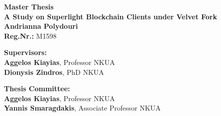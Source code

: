 \begin{center}
    \vspace{3cm}
    \large \textbf{Master Thesis}\\
    \vspace{3cm}
    \textbf{A Study on Superlight Blockchain Clients under Velvet Fork}\\
    \vspace{3cm}
    \large \textbf{Andrianna Polydouri}\\
    \textbf{Reg.Nr.:} M1598
 
    \begin{flushleft}
        \textbf{Supervisors:}\\ 
        \hspace{2cm}
        \textbf{Aggelos Kiayias}, Professor NKUA\\
        \hspace{2cm}
        \textbf{Dionysis Zindros}, PhD NKUA

        \textbf{Thesis Committee:}\\ 
        \hspace{2cm}
        \textbf{Aggelos Kiayias}, Professor NKUA\\
        \hspace{2cm}
        \textbf{Yannis Smaragdakis}, Associate Professor NKUA

    \end{flushleft}
\end{center}


\pagebreak